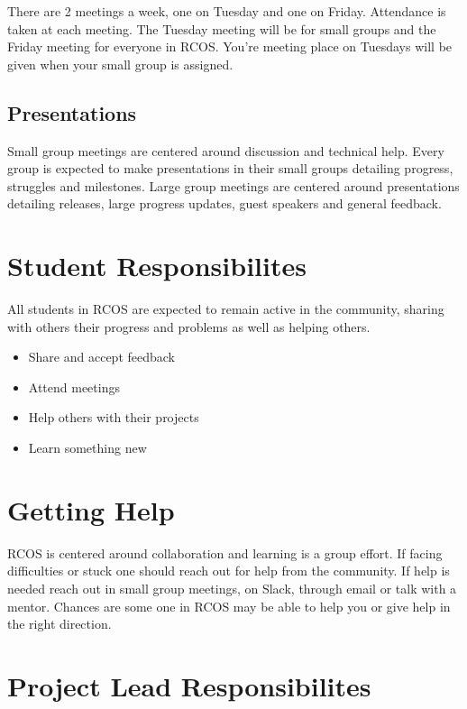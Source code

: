 \documentclass[12pt]{article}
\begin{document}
    There are 2 meetings a week, one on Tuesday and one on Friday. Attendance is taken at each meeting. The Tuesday meeting will be for small groups and the Friday meeting for everyone in RCOS. You're meeting place on Tuesdays will be given when your small group is assigned.

    \subsection{Presentations}

    Small group meetings are centered around discussion and technical help. Every group is expected to make presentations in their small groups detailing progress, struggles and milestones. Large group meetings are centered around presentations detailing releases, large progress updates, guest speakers and general feedback.


    \section{Student Responsibilites}

    All students in RCOS are expected to remain active in the community, sharing with others their progress and problems as well as helping others.

    \begin{itemize}
        \item Share and accept feedback
        \item Attend meetings
        \item Help others with their projects
        \item Learn something new
    \end{itemize}

    \section{Getting Help}

    RCOS is centered around collaboration and learning is a group effort. If facing difficulties or stuck one should reach out for help from the community. If help is needed reach out in small group meetings, on Slack, through email or talk with a mentor. Chances are some one in RCOS may be able to help you or give help in the right direction.

    \section{Project Lead Responsibilites}
\end{document}
